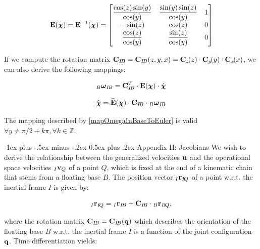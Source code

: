 \documentclass[10pt,landscape,a4paper]{article}
\makeatletter
\renewcommand{\section}{\@startsection{section}{1}{0mm}%
                               {-1ex plus -.5ex minus -.2ex}%
                                {0.5ex plus .2ex}%
                                {\normalfont\large\bfseries}}
\newcommand\pos[3]{{}_#1\vr_{#2\!#3}}
\newcommand\comat[2]{\vC_{#1\!#2}}
\newcommand\rotvel[3]{{}_#1\vom_{#2\!#3}}
\newcommand\dvch[0]{\dot{\vch}}
\makeatother
\begin{document}
\begin{multicols}{2}
\begin{equation}
\bar{\mathbf E}(\mbox{\boldmath $\chi$}) =
\mathbf E^{-1}(\mbox{\boldmath $\chi$}) =
\begin{bmatrix}
\dfrac{\cos(z)\sin(y)}{\cos(y)} &	\dfrac{\sin(y)\sin(z)}{\cos(y)} & 1 \\
-\sin(z)						&	\cos(z) 						& 0 \\
\dfrac{\cos(z)}{\cos(y)} 		& \dfrac{\sin(z)}{\cos(y)} 			& 0
\end{bmatrix}
\end{equation}

If we compute the rotation matrix $\comat{I}{B} = \comat{I}{B}(z,y,x) = \comat{z}{}(z) \cdot \comat{y}{}(y) \cdot \comat{x}{}(x)$, we can also derive the following mappings:

\begin{equation}\label{mapEulerToOmegainBase}
\rotvel{B}{I}{B} = \comat{I}{B}^T \cdot \vE(\vch) \cdot \dot{\vch}
\end{equation}

\begin{equation}\label{mapOmegaInBaseToEuler}
\dvch = \bar{\vE}(\vch) \cdot \comat{I}{B}  \cdot \rotvel{B}{I}{B}
\end{equation}

The mapping described by \eqref{mapOmegaInBaseToEuler} is valid $\forall y \ne \pi/2 + k\pi, \forall k \in \mathbb{Z}$.


\section{Appendix II: Jacobians}
We wish to derive the relationship between the generalized velocities $\mathbf u$ and the operational space velocities ${}_I\mathbf v_{Q}$ of a point $Q$, which is fixed at the end of a kinematic chain that stems from a floating base $B$. The position vector $\pos{I}{I}{Q}$ of a point w.r.t. the inertial frame $I$ is given by:

\begin{equation}
\pos{I}{I}{Q} = \pos{I}{I}{B} + \comat{I}{B} \cdot \pos{B}{B}{Q},
\end{equation}

where the rotation matrix $\comat{I}{B} = \comat{I}{B}(\vq)$ which describes the orientation of the floating base $B$ w.r.t. the inertial frame $I$ is a function of the joint configuration $\mathbf q$. Time differentiation yields:


\end{multicols}
\end{document}
